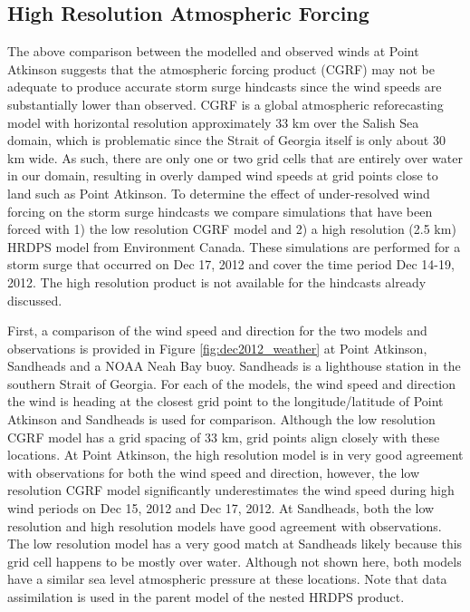 \documentclass[letterpaper]{tATO2e}
\begin{document}
\subsection{High Resolution Atmospheric Forcing}\label{sec:res}
The above comparison between the modelled and observed winds at Point Atkinson suggests that the atmospheric forcing product (CGRF) may not be adequate to produce accurate storm surge hindcasts since the wind speeds are substantially lower than observed. CGRF is a global atmospheric reforecasting model with horizontal resolution approximately 33 km over the Salish Sea domain, which is problematic since the Strait of Georgia itself is only about 30 km wide. As such, there are only one or two grid cells that are entirely over water in our domain, resulting in overly damped wind speeds at grid points close to land such as Point Atkinson. To determine the effect of under-resolved wind forcing on the storm surge hindcasts we compare simulations that have been forced with 1) the low resolution CGRF model and 2) a high resolution (2.5 km) HRDPS model from Environment Canada.  These simulations are performed for a storm surge that occurred on Dec 17, 2012 and cover the time period Dec 14-19, 2012. The high resolution product is not available for the hindcasts already discussed. 

{\color{red} First, a comparison of the wind speed and direction for the two models and observations is provided in Figure \ref{fig:dec2012_weather} at Point Atkinson, Sandheads and a NOAA Neah Bay buoy.  Sandheads is a lighthouse station in the southern Strait of Georgia.} For each of the models, the wind speed and direction {\color{red} the wind is heading} at the closest grid point to the longitude/latitude of Point Atkinson and Sandheads is used for comparison. Although the low resolution CGRF model has a grid spacing of 33 km, grid points align closely with these locations. At Point Atkinson, the high resolution model is in very good agreement with observations for both the wind speed and direction, however, the low resolution CGRF model significantly underestimates the wind speed during high wind periods on Dec 15, 2012 and Dec 17, 2012. At Sandheads, both the low resolution and high resolution models have good agreement with observations. The low resolution model has a very good match at Sandheads likely because this grid cell happens to be mostly over water. Although not shown here, both models have a similar sea level atmospheric pressure at these locations. Note that data assimilation is used in the parent model of the nested HRDPS product.
\end{document}
